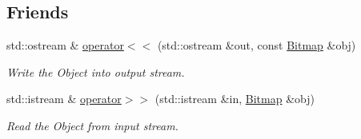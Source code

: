 \subsection*{Friends}
\begin{DoxyCompactItemize}
\item 
std::ostream \& \hyperlink{class_f2_c_1_1_bitmap_af27b9e1567e729dcb9dd43429b448ffd}{operator$<$$<$} (std::ostream \&out, const \hyperlink{class_f2_c_1_1_bitmap}{Bitmap} \&obj)
\begin{DoxyCompactList}\small\item\em Write the Object into output stream. \item\end{DoxyCompactList}\item 
std::istream \& \hyperlink{class_f2_c_1_1_bitmap_a7f4289174b7c1d16eec43e395922505c}{operator$>$$>$} (std::istream \&in, \hyperlink{class_f2_c_1_1_bitmap}{Bitmap} \&obj)
\begin{DoxyCompactList}\small\item\em Read the Object from input stream. \item\end{DoxyCompactList}\end{DoxyCompactItemize}


